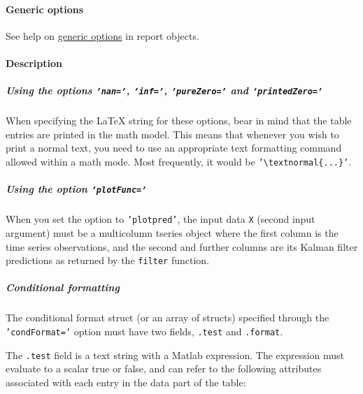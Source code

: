 \paragraph{Generic options}\label{generic-options}

See help on \href{report/Contents}{generic options} in report objects.

\paragraph{Description}\label{description}

\subparagraph{Using the options \texttt{'nan='}, \texttt{'inf='},
\texttt{'pureZero='} and
\texttt{'printedZero='}}\label{using-the-options-nan-inf-purezero-and-printedzero}

When specifying the LaTeX string for these options, bear in mind that
the table entries are printed in the math model. This means that
whenever you wish to print a normal text, you need to use an appropriate
text formatting command allowed within a math mode. Most frequently, it
would be \texttt{'\textbackslash{}textnormal\{...\}'}.

\subparagraph{Using the option
\texttt{'plotFunc='}}\label{using-the-option-plotfunc}

When you set the option to \texttt{'plotpred'}, the input data
\texttt{X} (second input argument) must be a multicolumn tseries object
where the first column is the time series observations, and the second
and further columns are its Kalman filter predictions as returned by the
\texttt{filter} function.

\subparagraph{Conditional formatting}\label{conditional-formatting}

The conditional format struct (or an array of structs) specified through
the \texttt{'condFormat='} option must have two fields, \texttt{.test}
and \texttt{.format}.

The \texttt{.test} field is a text string with a Matlab expression. The
expression must evaluate to a scalar true or false, and can refer to the
following attributes associated with each entry in the data part of the
table:

